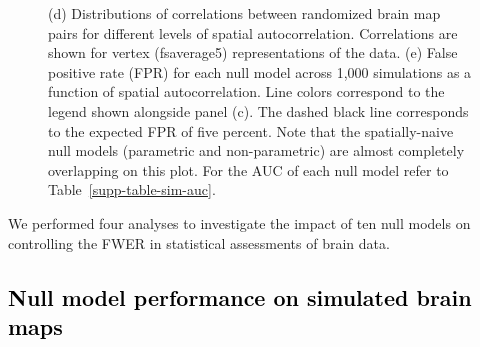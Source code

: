 \documentclass[12pt,aps,pra,reprint,showkeys]{revtex4-1}
\newcommand{\nimg}[1]{\textcolor{black}{{#1}}}
\begin{document}
\begin{figure}[htp]
\begin{center}
{{      (d) Distributions of correlations between randomized brain map pairs for different levels of spatial autocorrelation.
      Correlations are shown for vertex (fsaverage5) representations of the data.
      (e) False positive rate (FPR) for each null model across 1,000 simulations as a function of spatial autocorrelation.
      Line colors correspond to the legend shown alongside panel (c).
      The dashed black line corresponds to the expected FPR of five percent.
      Note that the spatially-naive null models (parametric and non-parametric) are almost completely overlapping on this plot.
      For the AUC of each null model refer to Table~\ref{supp-table-sim-auc}.}
      }
    \label{figure-simulation-results}
  \end{center}
\end{figure}

We performed four analyses to investigate the impact of ten null models on controlling the FWER in statistical assessments of brain data.

\subsection*{\nimg{Null model performance on simulated brain maps}}
\end{document}
